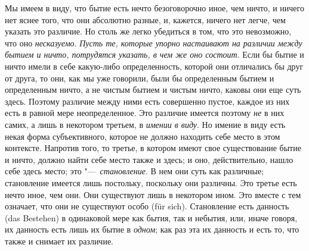 Мы имеем в виду, что бытие есть нечто безоговорочно иное, чем ничто, и
ничего нет яснее того, что они абсолютно разные, и, кажется, ничего нет
легче, чем указать это различие. Но столь же легко убедиться в том, что это
невозможно, что оно {\em несказуемо}.
{\em Пусть те, которые упорно}
{\em настаивают на различии между бытием и ничто,
потрудятся указать, в чем же оно состоит}. Если бы бытие и ничто имели в
себе какую-либо определенность, которой они отличались бы друг от друга, то
они, как мы уже говорили, были бы определенным бытием и определенным ничто,
а не чистым бытием и чистым ничто, каковы они еще суть здесь. Поэтому
различие между ними есть совершенно пустое, каждое из них есть в равной
мере неопределенное. Это различие имеется поэтому
{\em не} в них самих, а лишь в некотором третьем, в
{\em имении в виду}. Но имение в виду есть некая форма
субъективного, которое не должно находить себе место в этом контексте.
Напротив того, то третье, в котором имеют свое существование бытие и ничто,
должно найти себе место также и здесь; и оно, действительно, нашло себе
здесь место; это "---~{\em становление}. В нем они суть
как различные; становление имеется лишь постольку, поскольку они различны.
Это третье есть нечто иное, чем они. Они существуют лишь в некотором
ином. Это вместе с тем означает, что они не существуют особо (für sich).
Становление есть данность (das Bestehen) в одинаковой мере как бытия, так и
небытия, или, иначе говоря, их данность есть лишь их бытие в
{\em одном}; как раз эта их данность и есть то, что
также и снимает их различие.

